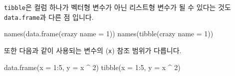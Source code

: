 \documentclass[
  a4paper,
]{book}
\newenvironment{Shaded}{\begin{snugshade}}{\end{snugshade}}
\newcommand{\AttributeTok}[1]{\textcolor[rgb]{0.40,0.45,0.13}{#1}}
\newcommand{\DecValTok}[1]{\textcolor[rgb]{0.68,0.00,0.00}{#1}}
\newcommand{\FunctionTok}[1]{\textcolor[rgb]{0.28,0.35,0.67}{#1}}
\newcommand{\NormalTok}[1]{\textcolor[rgb]{0.00,0.23,0.31}{#1}}
\newcommand{\OtherTok}[1]{\textcolor[rgb]{0.00,0.23,0.31}{#1}}
\newcommand{\SpecialCharTok}[1]{\textcolor[rgb]{0.37,0.37,0.37}{#1}}
\newcommand{\StringTok}[1]{\textcolor[rgb]{0.13,0.47,0.30}{#1}}
\begin{document}
\texttt{tibble}은 컬럼 하나가 벡터형 변수가 아닌 리스트형 변수가 될 수
있다는 것도 \texttt{data.frame}과 다른 점 입니다.

\begin{Shaded}
\begin{Highlighting}[]
\FunctionTok{names}\NormalTok{(}\FunctionTok{data.frame}\NormalTok{(}\StringTok{\textasciigrave{}}\AttributeTok{crazy name}\StringTok{\textasciigrave{}} \OtherTok{=} \DecValTok{1}\NormalTok{))}
\FunctionTok{names}\NormalTok{(}\FunctionTok{tibble}\NormalTok{(}\StringTok{\textasciigrave{}}\AttributeTok{crazy name}\StringTok{\textasciigrave{}} \OtherTok{=} \DecValTok{1}\NormalTok{))}
\end{Highlighting}
\end{Shaded}

또한 다음과 같이 사용되는 변수의 (\texttt{x}) 참조 범위가 다릅니다.

\begin{Shaded}
\begin{Highlighting}[]
\FunctionTok{data.frame}\NormalTok{(}\AttributeTok{x =} \DecValTok{1}\SpecialCharTok{:}\DecValTok{5}\NormalTok{, }\AttributeTok{y =}\NormalTok{ x }\SpecialCharTok{\^{}} \DecValTok{2}\NormalTok{)}
\FunctionTok{tibble}\NormalTok{(}\AttributeTok{x =} \DecValTok{1}\SpecialCharTok{:}\DecValTok{5}\NormalTok{, }\AttributeTok{y =}\NormalTok{ x }\SpecialCharTok{\^{}} \DecValTok{2}\NormalTok{)}
\end{Highlighting}
\end{Shaded}

\begin{Shaded}
\end{Shaded}
\end{document}
